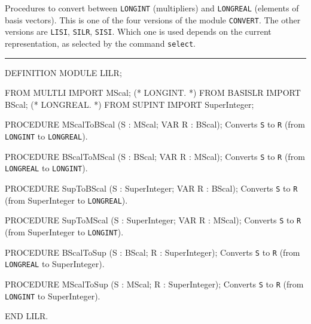 
Procedures to convert between {\tt LONGINT} (multipliers) and
{\tt LONGREAL} (elements of basis vectors).
This is one of the four versions of the module {\tt CONVERT}.
The other versions are {\tt LISI}, {\tt SILR}, {\tt SISI}.
Which one is used depends on the current representation, as selected by
the command {\tt select}.

\bigskip\hrule
\code

DEFINITION MODULE LILR;

FROM MULTLI  IMPORT MScal;             (* LONGINT.                        *)
FROM BASISLR IMPORT BScal;             (* LONGREAL.                       *)
FROM SUPINT  IMPORT SuperInteger;

PROCEDURE MScalToBScal (S : MScal;  VAR R : BScal);
\endcode
  \tab  Converts {\tt S} to {\tt R}
   (from {\tt LONGINT} to {\tt LONGREAL}).\endtab
\code

PROCEDURE BScalToMScal (S : BScal;  VAR R : MScal);
\endcode
  \tab  Converts {\tt S} to {\tt R}
   (from {\tt LONGREAL} to {\tt LONGINT}).\endtab
\code

PROCEDURE SupToBScal (S : SuperInteger;  VAR R : BScal);
\endcode
  \tab Converts {\tt S} to {\tt R}
   (from SuperInteger to {\tt LONGREAL}).\endtab
\code

PROCEDURE SupToMScal (S : SuperInteger;  VAR R : MScal);
\endcode
  \tab Converts {\tt S} to {\tt R}
   (from SuperInteger to {\tt LONGINT}).\endtab
\code

PROCEDURE BScalToSup (S : BScal;  R : SuperInteger);
\endcode
  \tab Converts {\tt S} to {\tt R}
   (from {\tt LONGREAL} to SuperInteger).\endtab
\code

PROCEDURE MScalToSup (S : MScal;  R : SuperInteger);
\endcode
  \tab Converts {\tt S} to {\tt R}
   (from {\tt LONGINT} to SuperInteger).\endtab
\code

END LILR.
\endcode

